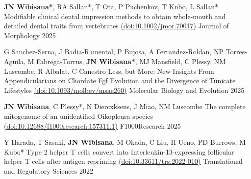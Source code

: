 

\begin{cventries}

  \cventrypub
    {\textbf{JN Wibisana*}, RA Sallan*, T Ota, P Puchenkov, T Kubo, L Sallan*} %
    {Modifiable clinical dental impression methods to obtain whole-mouth and detailed dental traits from vertebrates \href{https://doi.org/10.1002/jmor.70017}{(doi:10.1002/jmor.70017)}} %
    {Journal of Morphology} %
    {2025} %

  \cventrypub
    {G Sanchez-Serna, J Badia-Ramentol, P Bujosa, A Ferrandez-Roldan, NP Torres-Aguila, M Fabrega-Torrus, \textbf{JN Wibisana*}, MJ Mansfield, C Plessy, NM Luscombe, R Albalat, C Canestro} %
    {Less, but More: New Insights From Appendicularians on Chordate Fgf Evolution and the Divergence of Tunicate Lifestyles \href{https://doi.org/10.1093/molbev/msae260}{(doi:10.1093/molbev/msae260)}} %
    {Molecular Biology and Evolution} %
    {2025} %

  \cventrypub
    {\textbf{JN Wibisana}, C Plessy*, N Diercxksens, J Miao, NM Luscombe} %
    {The complete mitogenome of an unidentified Oikopleura species \href{https://doi.org/10.12688/f1000research.157311.1}{(doi:10.12688/f1000research.157311.1)}} %
    {F1000Research} %
    {2025} %

  \cventrypub
    {Y Harada, T Sasaki, \textbf{JN Wibisana}, M Okada, C Liu, H Ueno, PD Burrows, M Kubo*} %
    {Type 2 helper T cells convert into Interleukin-13-expressing follicular helper T cells after antigen repriming \href{https://doi.org/10.33611/trs.2022-010}{(doi:10.33611/trs.2022-010)}} %
    {Translational and Regulatory Sciences} %
    {2022} %


\end{cventries}
